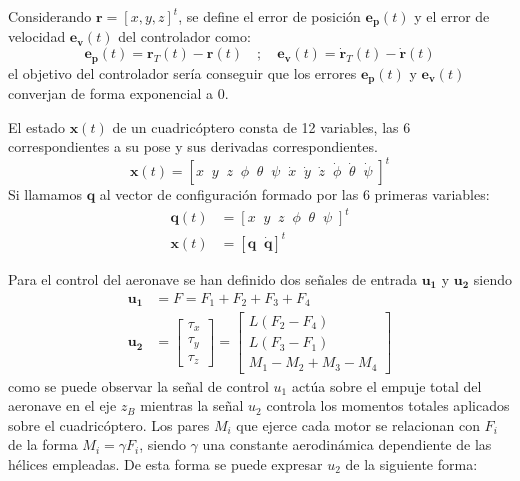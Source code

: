 Considerando $\mathbf{r} = [x,y,z]^t$, se define el error de posición $\mathbf{e_p}(t)$ y el error de velocidad $\mathbf{e_v}(t)$ del controlador como:
\begin{equation}
	\mathbf{e_p}(t) = \mathbf{r}_{T}(t) - \mathbf{r}(t) \quad;\quad 
\mathbf{e_v}(t) = \mathbf{\dot r}_{T}(t) - \mathbf{\dot r}(t)
\end{equation}
el objetivo del controlador sería conseguir que los errores $\mathbf{e_p}(t)$ y $\mathbf{e_v}(t)$ converjan de forma exponencial a 0.


El estado $\mathbf{x}(t)$ de un cuadricóptero consta de 12 variables, las 6 correspondientes a su pose y sus derivadas correspondientes.
\begin{equation}
\mathbf{x}(t) = \left[
	x  \;\;
	y  \;\;
	z  \;\;
	\phi  \;\;
	\theta  \;\;
	\psi  \;\;
	\dot{x}  \;\;
	\dot{y}  \;\;
	\dot{z}  \;\;
	\dot{\phi}  \;\;
	\dot{\theta}  \;\;
	\dot{\psi}\;\right]^t
\end{equation}
Si llamamos $\mathbf{q}$ al vector de configuración formado por las 6 primeras variables:
\begin{align}
	\mathbf{q}(t) &= \left[
	x  \;\;
	y  \;\;
	z  \;\;
	\phi  \;\;
	\theta  \;\;
	\psi  \;\right]^t\\
	\mathbf{x}(t) &= \left[\mathbf{q} \;\; \mathbf{\dot{q}}\right]^t
\end{align}

Para el control del aeronave se han definido dos señales de entrada $\mathbf{u_1}$ y $\mathbf{u_2}$ siendo 
\begin{align}
	\mathbf{u_1}  &= F =  F_1 +F_2 +F_3 +F_4  \label{eq:u1}\\
	\mathbf{u_2}  &= \begin{bmatrix} \tau_x\\ 
		\tau_y\\
		\tau_z
	\end{bmatrix} =\begin{bmatrix}
	L (F_2-F_4)\\
	L (F_3-F_1)\\
	M_1 - M_2 + M_3 - M_4
\end{bmatrix}
\end{align} 
como se puede observar la señal de control $u_1$ actúa sobre el empuje total del aeronave en el eje $z_B$ mientras la señal $u_2$ controla los momentos totales aplicados sobre el cuadricóptero. Los pares $M_i$ que ejerce cada motor se relacionan con $F_i$ de la forma $M_i = \gamma F_i$, siendo $\gamma$ una constante aerodinámica dependiente de las hélices empleadas. De esta forma se puede expresar $u_2$ de la siguiente forma:

